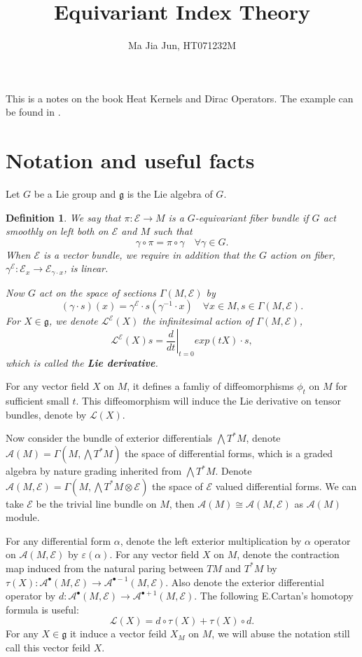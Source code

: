 \documentclass[12pt]{amsart}
\title{Equivariant Index Theory}
\author{Ma Jia Jun, HT071232M}
\newtheorem{Def}[Thm]{Definition}
\def\cA{{\mathcal{A}}}
\def\cL{{\mathcal{L}}}
\def\cE{{\mathcal{E}}}
\def\fgg{{\mathfrak{g}}}
\def\kw#1{{\bf \em #1}}
\begin{document}
\maketitle

This is a notes on the book Heat Kernels and Dirac Operators\cite{berline2004heat}. The example can be found in \cite{vergne1982representations}.

\section{Notation and useful facts}
Let $G$ be a Lie group and $\fgg$ is the Lie algebra of $G$.
\begin{Def}
We say that $\pi:\cE\to M$ is a  $G$-equivariant fiber bundle if $G$ act smoothly on left both on $\cE$ and $M$ such that 
\[
\gamma \circ \pi = \pi \circ \gamma \quad \forall \gamma\in G.
\]
When $\cE$ is a vector bundle, we require in addition that the $G$
action on fiber, $\gamma^\cE:\cE_x \to \cE_{\gamma\cdot x}$,  is linear.

Now $G$ act on the space of sections $\Gamma(M,\cE)$ by 
\[
(\gamma\cdot s)(x) = \gamma^\cE\cdot s(\gamma^{-1}\cdot x) \quad
\forall x\in M, s\in \Gamma(M,\cE). 
\]
For $X \in \fgg$, we denote $\cL^\cE(X)$ the infinitesimal action of
$\Gamma(M,\cE)$, 
\[
\cL^\cE(X) s =\left.\frac{d}{dt}\right|_{t=0} exp(tX)\cdot s,
\]
which is called the \kw{Lie derivative}.
\end{Def}
For any vector field $X$ on $M$, it defines a famliy of diffeomorphisms $\phi_t$
on $M$ for sufficient small $t$. This diffeomorphism will induce the
Lie derivative on tensor bundles, denote by $\cL(X)$. 

Now consider the bundle of exterior differentials $\bigwedge
T^*M$, denote $\cA(M)=\Gamma(M,\bigwedge T^*M)$  the space of
differential forms, which is a graded algebra by nature grading
inherited from $\bigwedge T^*M$.
Denote $\cA(M,\cE)=\Gamma(M,\bigwedge T^*M\otimes \cE)$  the space
of $\cE$ valued differential forms. We can take $\cE$ be the trivial
line bundle on $M$, then $\cA(M) \cong \cA(M,\cE)$ as $\cA(M)$ module.  

For any differential form $\alpha$, denote the
left exterior multiplication  by $\alpha$ operator on $\cA(M, \cE)$ by
$\varepsilon(\alpha)$.
For any vector field $X$ on $M$, denote the contraction map induced
from the natural paring between $TM$ and $T^*M$ by 
$\tau(X):\cA^\bullet(M,\cE)\to
\cA^{\bullet-1}(M,\cE)$. Also denote the exterior differential
operator by $d:\cA^\bullet(M,\cE) \to \cA^{\bullet+1}(M,\cE)$. The
  following E.Cartan's homotopy formula is useful:
\[
\cL(X) = d\circ \tau(X) + \tau(X)\circ d.
\]
For any $X\in \fgg$ it induce a vector feild $X_M$ on $M$, we will
abuse the notation still call this vector feild $X$.
\end{document}
